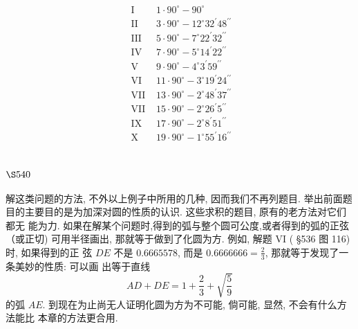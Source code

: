 \[
\begin{array}{ll}
\text { I } & 1 \cdot 90^{\circ}-90^{\circ} \\
\text { II } & 3 \cdot 90^{\circ}-12^{\circ} 32^{\prime} 48^{\prime \prime} \\
\text { III } & 5 \cdot 90^{\circ}-7^{\circ} 22^{\prime} 32^{\prime \prime} \\
\text { IV } & 7 \cdot 90^{\circ}-5^{\circ} 14^{\prime} 22^{\prime \prime} \\
\text { V } & 9 \cdot 90^{\circ}-4^{\circ} 3^{\prime} 59^{\prime \prime} \\
\text { VI } & 11 \cdot 90^{\circ}-3^{\circ} 19^{\prime} 24^{\prime \prime} \\
\text { VII } & 13 \cdot 90^{\circ}-2^{\circ} 48^{\prime} 37^{\prime \prime} \\
\text { VII } & 15 \cdot 90^{\circ}-2^{\circ} 26^{\prime} 5^{\prime \prime} \\
\text { IX } & 17 \cdot 90^{\circ}-2^{\circ} 8^{\prime} 51^{\prime \prime} \\
\text { X } & 19 \cdot 90^{\circ}-1^{\circ} 55^{\prime} 16^{\prime \prime}
\end{array}
\]
\section{$\S 540$}

解这类问题的方法, 不外以上例子中所用的几种, 因而我们不再列题目. 举出前面题 目的主要目的是为加深对圆的性质的认识. 这些求积的题目, 原有的老方法对它们都无 能为力. 如果在解某个问题时,得到的弧与整个圆可公度,或者得到的弧的正弦（或正切) 可用半径画出, 那就等于做到了化圆为方. 例如, 解题 VI ( §536 图 116) 时, 如果得到的正 弦 $D E$ 不是 $0.6665578$, 而是 $0.6666666=\frac{2}{3}$, 那就等于发现了一条美妙的性质: 可以画 出等于直线
\[
A D+D E=1+\frac{2}{3}+\sqrt{\frac{5}{9}}
\]
的弧 $A E$. 到现在为止尚无人证明化圆为方为不可能, 倘可能, 显然, 不会有什么方法能比 本章的方法更合用. 

